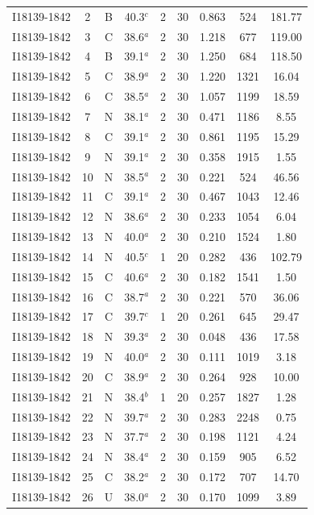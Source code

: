\begin{table}
\begin{tabular}{ccccccccc}
I18139-1842 & 2 & B & 40.3$^{c}$ & 2 & 30 & 0.863 & 524 & 181.77 \\
I18139-1842 & 3 & C & 38.6$^{a}$ & 2 & 30 & 1.218 & 677 & 119.00 \\
I18139-1842 & 4 & B & 39.1$^{a}$ & 2 & 30 & 1.250 & 684 & 118.50 \\
I18139-1842 & 5 & C & 38.9$^{a}$ & 2 & 30 & 1.220 & 1321 & 16.04 \\
I18139-1842 & 6 & C & 38.5$^{a}$ & 2 & 30 & 1.057 & 1199 & 18.59 \\
I18139-1842 & 7 & N & 38.1$^{a}$ & 2 & 30 & 0.471 & 1186 & 8.55 \\
I18139-1842 & 8 & C & 39.1$^{a}$ & 2 & 30 & 0.861 & 1195 & 15.29 \\
I18139-1842 & 9 & N & 39.1$^{a}$ & 2 & 30 & 0.358 & 1915 & 1.55 \\
I18139-1842 & 10 & N & 38.5$^{a}$ & 2 & 30 & 0.221 & 524 & 46.56 \\
I18139-1842 & 11 & C & 39.1$^{a}$ & 2 & 30 & 0.467 & 1043 & 12.46 \\
I18139-1842 & 12 & N & 38.6$^{a}$ & 2 & 30 & 0.233 & 1054 & 6.04 \\
I18139-1842 & 13 & N & 40.0$^{a}$ & 2 & 30 & 0.210 & 1524 & 1.80 \\
I18139-1842 & 14 & N & 40.5$^{c}$ & 1 & 20 & 0.282 & 436 & 102.79 \\
I18139-1842 & 15 & C & 40.6$^{a}$ & 2 & 30 & 0.182 & 1541 & 1.50 \\
I18139-1842 & 16 & C & 38.7$^{a}$ & 2 & 30 & 0.221 & 570 & 36.06 \\
I18139-1842 & 17 & C & 39.7$^{c}$ & 1 & 20 & 0.261 & 645 & 29.47 \\
I18139-1842 & 18 & N & 39.3$^{a}$ & 2 & 30 & 0.048 & 436 & 17.58 \\
I18139-1842 & 19 & N & 40.0$^{a}$ & 2 & 30 & 0.111 & 1019 & 3.18 \\
I18139-1842 & 20 & C & 38.9$^{a}$ & 2 & 30 & 0.264 & 928 & 10.00 \\
I18139-1842 & 21 & N & 38.4$^{b}$ & 1 & 20 & 0.257 & 1827 & 1.28 \\
I18139-1842 & 22 & N & 39.7$^{a}$ & 2 & 30 & 0.283 & 2248 & 0.75 \\
I18139-1842 & 23 & N & 37.7$^{a}$ & 2 & 30 & 0.198 & 1121 & 4.24 \\
I18139-1842 & 24 & N & 38.4$^{a}$ & 2 & 30 & 0.159 & 905 & 6.52 \\
I18139-1842 & 25 & C & 38.2$^{a}$ & 2 & 30 & 0.172 & 707 & 14.70 \\
I18139-1842 & 26 & U & 38.0$^{a}$ & 2 & 30 & 0.170 & 1099 & 3.89 \\

\end{tabular}
\end{table}
